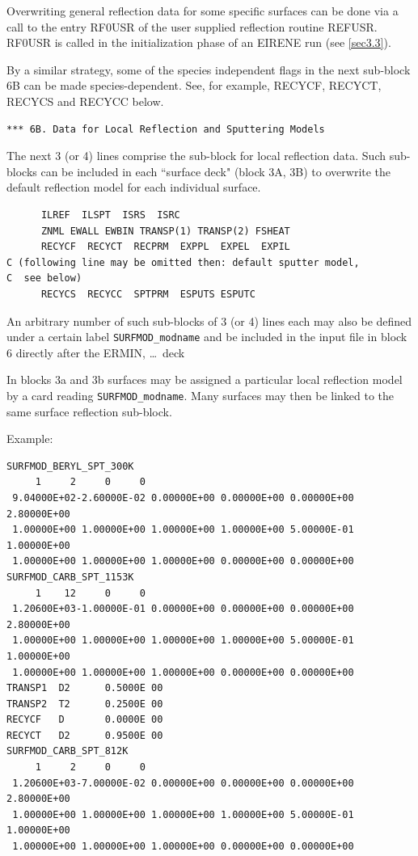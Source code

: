 Overwriting general reflection data for some specific surfaces can be done via
a call to the entry RF0USR of the user supplied reflection routine REFUSR.
RF0USR is called in the initialization phase of an EIRENE run (see
\cref{sec3.3}).

By a similar strategy, some of the species independent flags in the next
sub-block 6B can be made species-dependent.
See, for example, RECYCF, RECYCT, RECYCS and RECYCC below.

\medskip

\begin{lstlisting}
*** 6B. Data for Local Reflection and Sputtering Models
\end{lstlisting}

\medskip

The next 3 (or 4) lines comprise the sub-block for local reflection data.
Such sub-blocks can be included in each ``surface deck" (block 3A, 3B) to
overwrite the default reflection model for each individual surface.

\begin{lstlisting}
      ILREF  ILSPT  ISRS  ISRC
      ZNML EWALL EWBIN TRANSP(1) TRANSP(2) FSHEAT
      RECYCF  RECYCT  RECPRM  EXPPL  EXPEL  EXPIL
C (following line may be omitted then: default sputter model, 
C  see below)
      RECYCS  RECYCC  SPTPRM  ESPUTS ESPUTC
\end{lstlisting}

\medskip

An arbitrary number of such sub-blocks of 3 (or 4) lines each may also be
defined under a certain label \lstinline|SURFMOD_modname| and be included in the
input file in block 6 directly after the ERMIN, \dots\ deck 

In blocks 3a and 3b surfaces may be assigned a particular local reflection
model by a card reading \lstinline|SURFMOD_modname|.
Many surfaces may then be linked to the same surface reflection sub-block.

Example:

\begin{footnotesize}
  \begin{lstlisting}
SURFMOD_BERYL_SPT_300K
     1     2     0     0
 9.04000E+02-2.60000E-02 0.00000E+00 0.00000E+00 0.00000E+00 2.80000E+00
 1.00000E+00 1.00000E+00 1.00000E+00 1.00000E+00 5.00000E-01 1.00000E+00
 1.00000E+00 1.00000E+00 1.00000E+00 0.00000E+00 0.00000E+00
SURFMOD_CARB_SPT_1153K
     1    12     0     0
 1.20600E+03-1.00000E-01 0.00000E+00 0.00000E+00 0.00000E+00 2.80000E+00
 1.00000E+00 1.00000E+00 1.00000E+00 1.00000E+00 5.00000E-01 1.00000E+00
 1.00000E+00 1.00000E+00 1.00000E+00 0.00000E+00 0.00000E+00
TRANSP1  D2      0.5000E 00
TRANSP2  T2      0.2500E 00
RECYCF   D       0.0000E 00
RECYCT   D2      0.9500E 00
SURFMOD_CARB_SPT_812K
     1     2     0     0
 1.20600E+03-7.00000E-02 0.00000E+00 0.00000E+00 0.00000E+00 2.80000E+00
 1.00000E+00 1.00000E+00 1.00000E+00 1.00000E+00 5.00000E-01 1.00000E+00
 1.00000E+00 1.00000E+00 1.00000E+00 0.00000E+00 0.00000E+00
\end{lstlisting}
\end{footnotesize}

